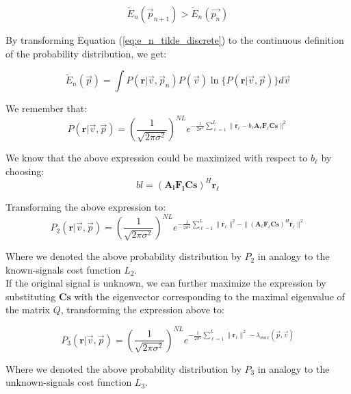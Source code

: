 \documentclass[10pt,a4paper]{report}
\begin{document}
\begin{equation}
\tilde{E}_n(\vec{p}_{n+1})>\tilde{E}_n(\vec{p_{n}})
\end{equation}


By transforming Equation (\ref{eq:e_n_tilde_discrete}) to the continuous definition of the probability distribution, we get:

\begin{equation}
\label{eq:e_n_tilde_continuous}
\tilde{E}_n(\vec{p}) =
\int
P(\mathbf{r}|\vec{v},\vec{p}_n)P(\vec{v})
\ln \{P(\mathbf{r}|\vec{v},\vec{p})\} 
d\vec{v}
\end{equation}

We remember that:
\begin{equation}
P(\mathbf{r}|\vec{v},\vec{p})=
\left(\frac{1}{\sqrt{2 \pi \sigma^2}}\right)^{NL}
e^
{
-
\frac{1}{2\sigma^2}
\sum_{\ell=1}^L
\|\mathbf{r}_{\ell}-b_{\ell}\mathbf{A_{\ell}}\mathbf{F_{\ell}}\mathbf{C}\mathbf{s}\|^2
}
\end{equation}

We know that the above expression could be maximized with respect to $b_\ell$ by choosing:
$$bl=(\mathbf{A_l F_l C s})^H\mathbf{r_\ell}$$

Transforming the above expression to:
\begin{equation}
P_2(\mathbf{r}|\vec{v},\vec{p})=
\left(\frac{1}{\sqrt{2 \pi \sigma^2}}\right)^{NL}
e^
{
-
\frac{1}{2\sigma^2}
\sum_{\ell=1}^L \|\mathbf{r_\ell}\|^2-\|(\mathbf{A_\ell F_\ell C s})^H\mathbf{r_\ell}\|^2
}
\end{equation}

Where we denoted the above probability distribution by $P_2$ in analogy to the known-signals cost function $L_2$.\\

If the original signal is unknown, we can further maximize the expression by substituting $\mathbf{Cs}$ with the eigenvector corresponding to the maximal eigenvalue of the matrix $Q$, transforming the expression above to:

\begin{equation}
P_3(\mathbf{r}|\vec{v},\vec{p})=
\left(\frac{1}{\sqrt{2 \pi \sigma^2}}\right)^{NL}
e^
{
-
\frac{1}{2\sigma^2}
\sum_{\ell=1}^L \|\mathbf{r_\ell}\|^2-
\lambda_{max}(\vec{p},\vec{v})
}
\end{equation}

Where we denoted the above probability distribution by $P_3$ in analogy to the unknown-signals cost function $L_3$.\\
\end{document}
